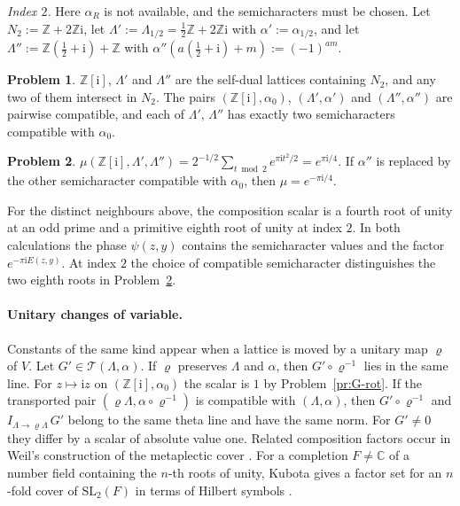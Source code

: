 \documentclass[reqno]{amsart}
\theoremstyle{definition}
\newtheorem{problem}{Problem}[section]
\theoremstyle{plain}
\newcommand{\Z}{\mathbb{Z}}
\newcommand{\C}{\mathbb{C}}
\newcommand{\ii}{\mathrm{i}}
\begin{document}
\emph{Index \(2\).}  Here \(\alpha_R\) is not available, and the semicharacters must be chosen.  Let \(N_2 := \Z + 2\Z\ii\), let \(\Lambda' := \Lambda_{1/2} = \frac12\Z + 2\Z\ii\) with \(\alpha' := \alpha_{1/2}\), and let \(\Lambda'' := \Z(\frac12 + \ii) + \Z\) with \(\alpha''(a(\frac12 + \ii) + m) := (-1)^{am}\).

\begin{problem}\label{pr:index2}
\(\Z[\ii]\), \(\Lambda'\) and \(\Lambda''\) are the self-dual lattices containing \(N_2\), and any two of them intersect in \(N_2\).  The pairs \((\Z[\ii],\alpha_0)\), \((\Lambda',\alpha')\) and \((\Lambda'',\alpha'')\) are pairwise compatible, and each of \(\Lambda'\), \(\Lambda''\) has exactly two semicharacters compatible with \(\alpha_0\).
\end{problem}

\begin{problem}\label{pr:mu-2}
\(\mu(\Z[\ii], \Lambda', \Lambda'') = 2^{-1/2}\sum_{t \bmod 2} e^{\pi\ii t^2/2} = e^{\pi\ii/4}\).  If \(\alpha''\) is replaced by the other semicharacter compatible with \(\alpha_0\), then \(\mu = e^{-\pi\ii/4}\).
\end{problem}

For the distinct neighbours above, the composition scalar is a fourth root of unity at an odd prime and a primitive eighth root of unity at index \(2\).  In both calculations the phase \(\psi(z,y)\) contains the semicharacter values and the factor \(e^{-\pi\ii E(z,y)}\).  At index \(2\) the choice of compatible semicharacter distinguishes the two eighth roots in Problem~\ref{pr:mu-2}.

\paragraph{Unitary changes of variable.}
Constants of the same kind appear when a lattice is moved by a unitary map \(\varrho\) of \(V\).  Let \(G' \in \mathcal{T}(\Lambda,\alpha)\).  If \(\varrho\) preserves \(\Lambda\) and \(\alpha\), then \(G' \circ \varrho^{-1}\) lies in the same line.  For \(z \mapsto \ii z\) on \((\Z[\ii],\alpha_0)\) the scalar is \(1\) by Problem~\ref{pr:G-rot}.  If the transported pair \((\varrho\Lambda,\alpha\circ\varrho^{-1})\) is compatible with \((\Lambda,\alpha)\), then \(G' \circ \varrho^{-1}\) and \(I_{\Lambda \to \varrho\Lambda}\,G'\) belong to the same theta line and have the same norm.  For \(G' \ne 0\) they differ by a scalar of absolute value one.  Related composition factors occur in Weil's construction of the metaplectic cover \cite{We}.  For a completion \(F \ne \C\) of a number field containing the \(n\)-th roots of unity, Kubota gives a factor set for an \(n\)-fold cover of \(\mathrm{SL}_2(F)\) in terms of Hilbert symbols \cite{Kub}.
\end{document}
